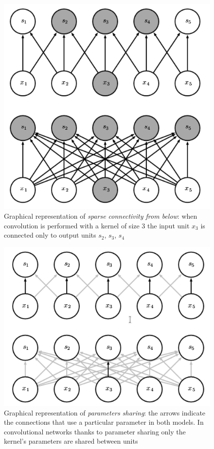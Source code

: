 \documentclass[11pt,a4paper,titlepage]{book}
\begin{document}
\begin{figure}[ht]
    \includegraphics[scale=0.5]{imgs/ch_1/sparse_connectivity_below.png}
    \centering
    \caption{Graphical representation of \textit{sparse connectivity from below}: when convolution is performed with a kernel of size 3 the input unit $x_3$ is connected only to output units $s_2$, $s_3$, $s_4$}
    \label{sparse_connectivity_below}
\end{figure}
\begin{figure}[ht]
    \includegraphics[scale=0.5]{imgs/ch_1/parameter_sharing.png}
    \centering
    \caption{Graphical representation of \textit{parameters sharing}: the arrows indicate the connections that use a particular parameter in both models. In convolutional networks thanks to parameter sharing only the kernel's parameters are shared between units}
    \label{parameters_sharing}
\end{figure}
\end{document}
